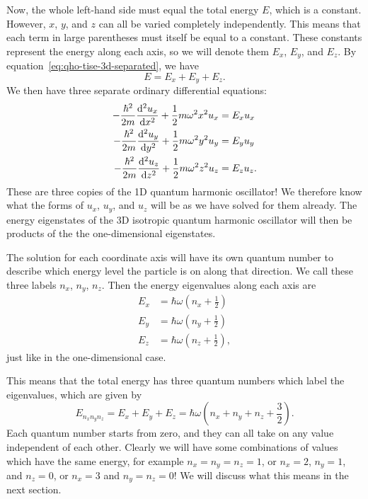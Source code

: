 \documentclass[../quantum_mechanics.tex]{subfiles}
\begin{document}
            Now, the whole left-hand side must equal the total energy $E$, which is a constant.
            However, $x$, $y$, and $z$ can all be varied completely independently.
            This means that each term in large parentheses must itself be equal to a constant.
            These constants represent the energy along each axis, so we will denote them $E_x$, $E_y$, and $E_z$.
            By equation~\ref{eq:qho-tise-3d-separated}, we have
            \begin{equation}
                E=E_x+E_y+E_z.
            \end{equation}
            We then have three separate ordinary differential equations:
            \begin{align}
                -\frac{\hbar^2}{2m}\dv[2]{u_x}{x}+\frac{1}{2}m\omega^2x^2u_x&=E_xu_x\\
                -\frac{\hbar^2}{2m}\dv[2]{u_y}{y}+\frac{1}{2}m\omega^2y^2u_y&=E_yu_y\\
                -\frac{\hbar^2}{2m}\dv[2]{u_z}{z}+\frac{1}{2}m\omega^2z^2u_z&=E_zu_z.
            \end{align}
            These are three copies of the 1D quantum harmonic oscillator!
            We therefore know what the forms of $u_x$, $u_y$, and $u_z$ will be as we have solved for them already.
            The energy eigenstates of the 3D isotropic quantum harmonic oscillator will then be products of the the one-dimensional eigenstates.

            The solution for each coordinate axis will have its own quantum number to describe which energy level the particle is on along that direction.
            We call these three labels $n_x$, $n_y$, $n_z$.
            Then the energy eigenvalues along each axis are
            \begin{align}
                E_x&=\hbar\omega\left(n_x+\frac{1}{2}\right)\\
                E_y&=\hbar\omega\left(n_y+\frac{1}{2}\right)\\
                E_z&=\hbar\omega\left(n_z+\frac{1}{2}\right),
            \end{align}
            just like in the one-dimensional case.

            This means that the total energy has three quantum numbers which label the eigenvalues, which are given by
            \begin{equation}\label{eq:qho-eigenvalues-3d}
                E_{n_xn_yn_z}=E_x+E_y+E_z=\hbar\omega\left(n_x+n_y+n_z+\frac{3}{2}\right).
            \end{equation}
            Each quantum number starts from zero, and they can all take on any value independent of each other.
            Clearly we will have some combinations of values which have the same energy, for example $n_x=n_y=n_z=1$, or $n_x=2$, $n_y=1$, and $n_z=0$, or $n_x=3$ and $n_y=n_z=0$!
            We will discuss what this means in the next section.
\end{document}
